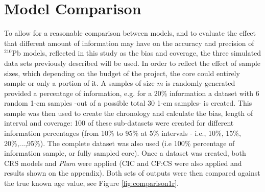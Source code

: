 \documentclass [10pt] {article}
\begin{document}
\section{Model Comparison}

To allow for a reasonable comparison between models, and to evaluate the effect that different amount of information may have on the accuracy and precision of $^{210}$Pb models, reflected in this study as the bias and coverage, the three simulated data sets previously described will be used. 
In order to reflect the effect of sample sizes, which depending on the budget of the project, the core could entirely sample or only a portion of it.
A samples of size $m$ is randomly generated provided a percentage of information, e.g. for a 20\% information a dataset with 6 random 1-cm samples -out of a possible total 30 1-cm samples- is created.
This sample was then used to create the chronology and calculate the bias, length of interval and coverage:
100 of these sub-datasets were created for different information percentages (from 10\% to 95\% at 5\% intervals - i.e., 10\%, 15\%, 20\%,...,95\%). 
The complete dataset was also used (i.e 100\% percentage of information sample, or fully sampled core).
Once a dataset was created, both CRS models and \textit{Plum} were applied (CIC and CF:CS were also applied and results shown on the appendix).  
Both sets of outputs were then compared against the true known age value, see Figure \ref{fig:comparison1r}.
\end{document}
